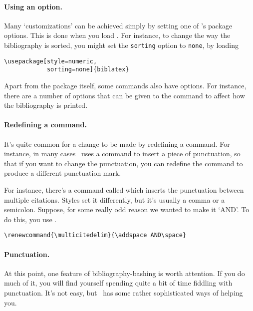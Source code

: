 \paragraph{Using an option.}
Many `customizations' can be achieved simply by setting one of
\biblatex's package options. This is done when you load \biblatex. For
instance, to change the way the bibliography is sorted, you might set
the \verb|sorting| option to \verb|none|, by loading
\begin{verbatim}
\usepackage[style=numeric,
            sorting=none]{biblatex}
\end{verbatim}

Apart from the package itself, some commands also have options. For
instance, there are a number of options that can be given to the
command to affect how the bibliography is printed.

\paragraph{Redefining a command.} It's quite common for a change to be
made by redefining a command. For instance, in many cases \biblatex\
uses a command to insert a piece of punctuation, so that if you want
to change the punctuation,\intref{See p~\pageref{sec:punctuation}}
you can redefine the command to produce a different punctuation mark.

For instance, there's a command called  which
inserts the punctuation between multiple citations. Styles set it
differently, but it's usually a comma or a semicolon. Suppose, for
some really odd reason we wanted to make it `AND'. To do this, you use
\cs{renewcommand}.
\begin{verbatim}
\renewcommand{\multicitedelim}{\addspace AND\space}
\end{verbatim}

\paragraph{Punctuation.} At this point, one feature of
bibliography-bashing is worth attention. If you do much of it, you
will find yourself spending quite a bit of time fiddling with
punctuation. It's not easy, but \biblatex\ has some rather
sophisticated ways of helping you.

